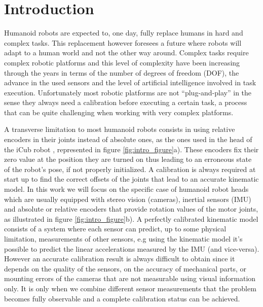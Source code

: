 \section{Introduction}

Humanoid robots are expected to, one day, fully replace humans in hard and complex tasks. This replacement however foresees a future where robots will adapt to a human world and not the other way around. Complex tasks require complex robotic platforms and this level of complexity have been increasing through the years in terms of the number of degrees of freedom (DOF), the advance in the used sensors and the level of artificial intelligence involved in task execution. Unfortunately most robotic platforms are not “plug-and-play” in the sense they always need a calibration before executing a certain task, a process that can be quite challenging when working with very complex platforms.

A transverse limitation to most humanoid robots consists in using relative encoders in their joints instead of absolute ones, as the ones used in the head of the iCub robot \cite{Beira06}, represented in figure \ref{fig:intro_figure}a). These encoders fix their zero value at the position they are turned on thus leading to an erroneous state of the robot's pose, if not properly initialized. A calibration is always required at start up to find the correct offsets of the joints that lead to an accurate kinematic model. In this work we will focus on the specific case of humanoid robot heads which are usually equipped with stereo vision (cameras), inertial sensors (IMU) and absolute or relative encoders that provide rotation values of the motor joints, as illustrated in figure \ref{fig:intro_figure}b). A perfectly calibrated kinematic model consists of a system where each sensor can predict, up to some physical limitation, measurements of other sensors, e.g using the kinematic model it's possible to predict the linear accelerations measured by the IMU (and vice-versa). However an accurate calibration result is always difficult to obtain since it depends on the quality of the sensors, on the accuracy of mechanical parts, or mounting errors of the cameras that are not measurable using visual information only. It is only when we combine different sensor measurements that the problem becomes fully observable and a complete calibration status can be achieved.

